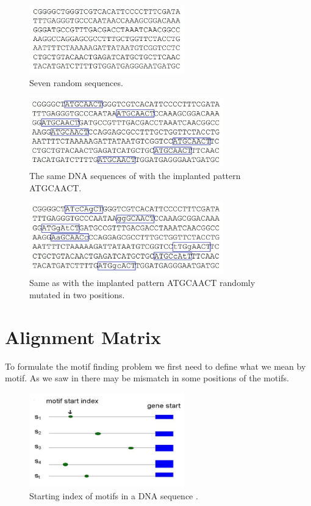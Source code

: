 \begin{figure}%
	\centering
	\includegraphics[width=0.6\textwidth]{figures/seq1}
	\caption{Seven random sequences.}
	\label{fig:seq1}
\end{figure}
\begin{figure}[!tb]
	\centering
	\includegraphics[width=0.75\textwidth]{figures/seq2}
	\caption{The same DNA sequences of 
		with the implanted pattern ATGCAACT.}
	\label{fig:seq2}
\end{figure}
\begin{figure}[!tb]
	\centering
	\includegraphics[width=0.75\textwidth]{figures/seq3}
	\caption{Same as  with the implanted
		pattern ATGCAACT randomly
		mutated in two positions.}
	\label{fig:seq3}
\end{figure}


\section{Alignment Matrix}
To formulate the motif finding problem we first need to define
what we mean by motif. As we saw in  there may be
mismatch in some positions of the motifs.

\begin{figure}%
	\centering
	\includegraphics[width=0.6\textwidth]{figures/sindex}
	\caption{Starting index of motifs in a DNA sequence .}
	\label{fig:sindex}
\end{figure}


